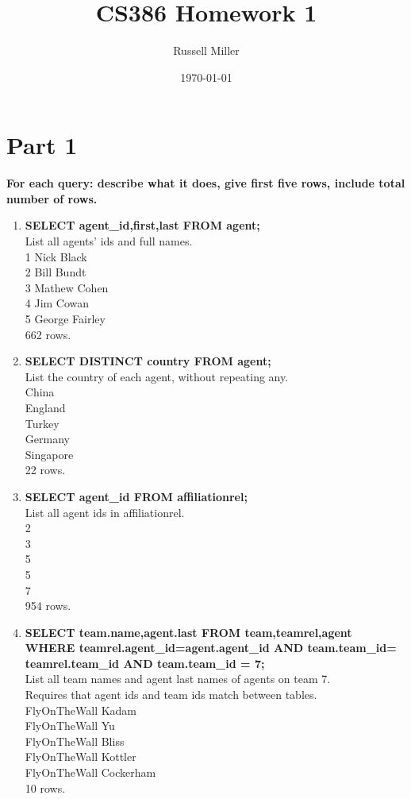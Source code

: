 \documentclass{article}
\title{CS386 Homework 1}
\author{Russell Miller}
\date{\today}
\begin{document}
\maketitle

\section*{Part 1}
\textbf{For each query: describe what it does, give first five rows, include total number of rows.}

\begin{enumerate}

\item
\textbf{SELECT agent\_id,first,last  FROM agent;\\}
\textsf{List all agents' ids and full names.\\
1 Nick Black\\
2 Bill Bundt\\
3 Mathew Cohen\\
4 Jim Cowan\\
5 George Fairley\\
662 rows.\\}

\item
\textbf{SELECT DISTINCT country  FROM agent;\\}
\textsf{List the country of each agent, without repeating any.\\
China\\
England\\
Turkey\\
Germany\\
Singapore\\
22 rows.\\}

\item
\textbf{SELECT agent\_id FROM affiliationrel;\\}
\textsf{List all agent ids in affiliationrel.\\
2\\
3\\
5\\
5\\
7\\
954 rows.\\}

\pagebreak

\item
\textbf{SELECT team.name,agent.last  FROM team,teamrel,agent\\
WHERE teamrel.agent\_id=agent.agent\_id AND team.team\_id=
teamrel.team\_id AND team.team\_id = 7;\\}
\textsf{List all team names and agent last names of agents on team 7.\\
Requires that agent ids and team ids match between tables.\\
FlyOnTheWall  Kadam\\
FlyOnTheWall  Yu\\
FlyOnTheWall  Bliss\\
FlyOnTheWall  Kottler\\
FlyOnTheWall  Cockerham\\
10 rows.\\}


\end{enumerate}
\end{document}
